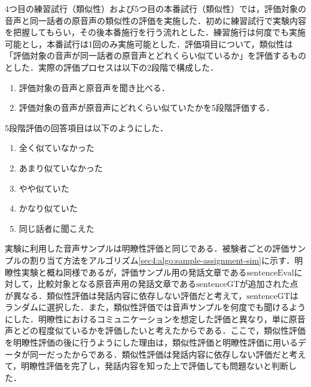 4つ目の練習試行（類似性）および5つ目の本番試行（類似性）では，評価対象の音声と同一話者の原音声の類似性の評価を実施した．初めに練習試行で実験内容を把握してもらい，その後本番施行を行う流れとした．練習施行は何度でも実施可能とし，本番試行は1回のみ実施可能とした．評価項目について，類似性は「評価対象の音声が同一話者の原音声とどれくらい似ているか」を評価するものとした．実際の評価プロセスは以下の2段階で構成した．
\begin{enumerate}
    \item 評価対象の音声と原音声を聞き比べる．
    \item 評価対象の音声が原音声にどれくらい似ていたかを5段階評価する．
\end{enumerate}
5段階評価の回答項目は以下のようにした．
\begin{enumerate}
    \item 全く似ていなかった
    \item あまり似ていなかった
    \item やや似ていた
    \item かなり似ていた
    \item 同じ話者に聞こえた
\end{enumerate}
実験に利用した音声サンプルは明瞭性評価と同じである．被験者ごとの評価サンプルの割り当て方法をアルゴリズム\ref{sec4:algo:sample-assignment-sim}に示す．明瞭性実験と概ね同様であるが，評価サンプル用の発話文章である$\text{sentenceEval}$に対して，比較対象となる原音声用の発話文章である$\text{sentenceGT}$が追加された点が異なる．類似性評価は発話内容に依存しない評価だと考えて，$\text{sentenceGT}$はランダムに選択した．また，類似性評価では音声サンプルを何度でも聞けるようにした．明瞭性におけるコミュニケーションを想定した評価と異なり，単に原音声とどの程度似ているかを評価したいと考えたからである．ここで，類似性評価を明瞭性評価の後に行うようにした理由は，類似性評価と明瞭性評価に用いるデータが同一だったからである．類似性評価は発話内容に依存しない評価だと考えて，明瞭性評価を完了し，発話内容を知った上で評価しても問題ないと判断した．
